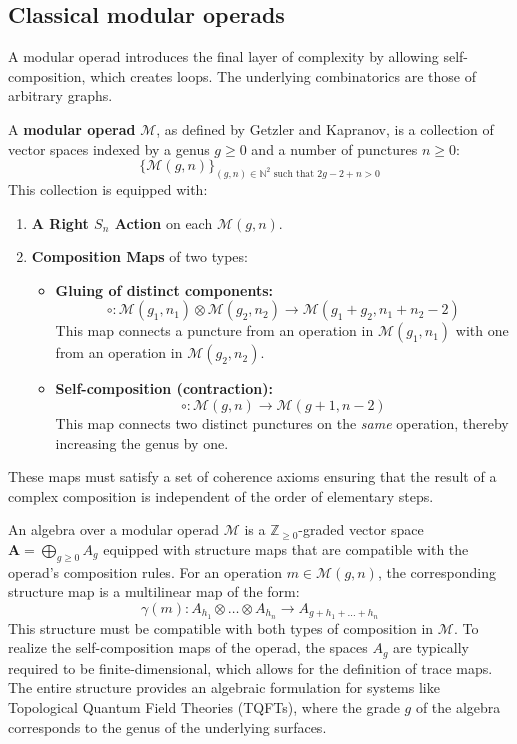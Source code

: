 \documentclass[11pt]{article}
\newcommand{\cat}[1]{\mathcal{#1}}
\newcommand{\N}{\mathbb{N}}
\theoremstyle{definition}
\begin{document}
\subsection{Classical modular operads}


A modular operad introduces the final layer of complexity by allowing self-composition, which creates loops. The underlying combinatorics are those of arbitrary graphs.


A \textbf{modular operad} $\cat{M}$, as defined by Getzler and Kapranov, is a collection of vector spaces indexed by a genus $g \ge 0$ and a number of punctures $n \ge 0$:
\[
    \{\cat{M}(g, n)\}_{(g, n) \in \N^2 \text{ such that } 2g-2+n>0}
\]
This collection is equipped with:
\begin{enumerate}
    \item \textbf{A Right $S_n$ Action} on each $\cat{M}(g, n)$.
    
    \item \textbf{Composition Maps} of two types:
    \begin{itemize}
        \item \textbf{Gluing of distinct components:}
        \[
            \circ : \cat{M}(g_1, n_1) \otimes \cat{M}(g_2, n_2) \to \cat{M}(g_1+g_2, n_1+n_2-2)
        \]
        This map connects a puncture from an operation in $\cat{M}(g_1, n_1)$ with one from an operation in $\cat{M}(g_2, n_2)$.
        
        \item \textbf{Self-composition (contraction):}
        \[
            \circ : \cat{M}(g, n) \to \cat{M}(g+1, n-2)
        \]
        This map connects two distinct punctures on the \emph{same} operation, thereby increasing the genus by one.
    \end{itemize}
\end{enumerate}
These maps must satisfy a set of coherence axioms ensuring that the result of a complex composition is independent of the order of elementary steps.


An algebra over a modular operad $\cat{M}$ is a $\mathbb{Z}_{\ge 0}$-graded vector space $\mathbf{A} = \bigoplus_{g \ge 0} A_g$ equipped with structure maps that are compatible with the operad's composition rules. For an operation $m \in \cat{M}(g, n)$, the corresponding structure map is a multilinear map of the form:
\[
    \gamma(m) : A_{h_1} \otimes \dots \otimes A_{h_n} \to A_{g + h_1 + \dots + h_n}
\]
This structure must be compatible with both types of composition in $\cat{M}$. To realize the self-composition maps of the operad, the spaces $A_g$ are typically required to be finite-dimensional, which allows for the definition of trace maps. The entire structure provides an algebraic formulation for systems like Topological Quantum Field Theories (TQFTs), where the grade $g$ of the algebra corresponds to the genus of the underlying surfaces.
\end{document}
